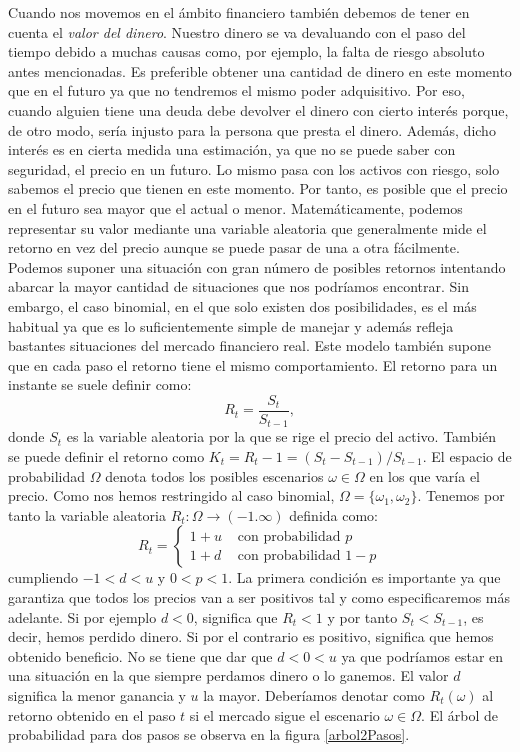 Cuando nos movemos en el ámbito financiero también debemos de tener en cuenta el \textit{valor del dinero}. Nuestro dinero se va devaluando con el paso del tiempo debido a muchas causas como, por ejemplo, la falta de riesgo absoluto antes mencionadas. Es preferible obtener una cantidad de dinero en este momento que en el futuro ya que no tendremos el mismo poder adquisitivo. Por eso, cuando alguien tiene una deuda debe devolver el dinero con cierto interés porque, de otro modo, sería injusto para la persona que presta el dinero. Además, dicho interés es en cierta medida una estimación, ya que no se puede saber con seguridad, el precio en un futuro. Lo mismo pasa con los activos con riesgo, solo sabemos el precio que tienen en este momento. Por tanto, es posible que el precio en el futuro sea mayor que el actual o menor. Matemáticamente, podemos representar su valor mediante una variable aleatoria que generalmente mide el retorno en vez del precio aunque se puede pasar de una a otra fácilmente. Podemos suponer una situación con gran número de posibles retornos intentando abarcar la mayor cantidad de situaciones que nos podríamos encontrar. Sin embargo, el caso binomial, en el que solo existen dos posibilidades, es el más habitual ya que es lo suficientemente simple de manejar y además refleja bastantes situaciones del mercado financiero real. Este modelo también supone que en cada paso el retorno tiene el mismo comportamiento. El retorno para un instante se suele definir como:
\[
R_t = \frac{S_t}{S_{t-1}},
\]
donde $ S_t $ es la variable aleatoria por la que se rige el precio del activo. También se puede definir el retorno como $ K_t = R_t - 1 = (S_t-S_{t-1})/S_{t-1}$. El espacio de probabilidad $ \Omega $ denota todos los posibles escenarios $ \omega \in \Omega $ en los que varía el precio. Como nos hemos restringido al caso binomial, $ \Omega = \{ \omega_1, \omega_2\} $. Tenemos por tanto la variable aleatoria $ R_t:\Omega \longrightarrow (-1.\infty) $ definida como:
\[
R_t = \begin{cases}
1+ u & \text{ con probabilidad } p\\
1+ d & \text{ con probabilidad } 1-p
\end{cases}
\]
cumpliendo $ -1 < d < u $ y $ 0 < p <1 $. La primera condición es importante ya que garantiza que todos los precios van a ser positivos tal y como especificaremos más adelante. Si por ejemplo $ d < 0 $, significa que $ R_t < 1 $ y por tanto $ S_t < S_{t-1} $, es decir, hemos perdido dinero. Si por el contrario es positivo, significa que hemos obtenido beneficio. No se tiene que dar que $ d < 0 < u$ ya que podríamos estar en una situación en la que siempre perdamos dinero o lo ganemos. El valor $ d $ significa la menor ganancia y $ u $ la mayor. Deberíamos denotar como $ R_t(\omega) $ al retorno obtenido en el paso $ t $ si el mercado sigue el escenario $ \omega \in \Omega $. El árbol de probabilidad para dos pasos se observa en la figura \ref{arbol2Pasos}. \\

